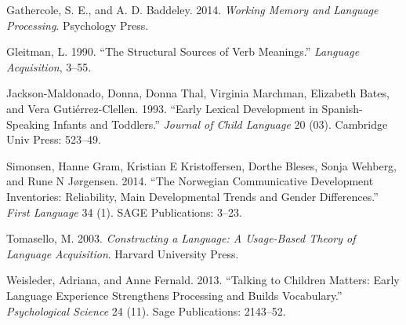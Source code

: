 \documentclass[authoryear, review]{elsarticle}
\begin{document}
Gathercole, S. E., and A. D. Baddeley. 2014. \emph{Working Memory and
Language Processing}. Psychology Press.

Gleitman, L. 1990. ``The Structural Sources of Verb Meanings.''
\emph{Language Acquisition}, 3--55.

Jackson-Maldonado, Donna, Donna Thal, Virginia Marchman, Elizabeth
Bates, and Vera Gutiérrez-Clellen. 1993. ``Early Lexical Development in
Spanish-Speaking Infants and Toddlers.'' \emph{Journal of Child
Language} 20 (03). Cambridge Univ Press: 523--49.

Simonsen, Hanne Gram, Kristian E Kristoffersen, Dorthe Bleses, Sonja
Wehberg, and Rune N Jørgensen. 2014. ``The Norwegian Communicative
Development Inventories: Reliability, Main Developmental Trends and
Gender Differences.'' \emph{First Language} 34 (1). SAGE Publications:
3--23.

Tomasello, M. 2003. \emph{Constructing a Language: A Usage-Based Theory
of Language Acquisition}. Harvard University Press.

Weisleder, Adriana, and Anne Fernald. 2013. ``Talking to Children
Matters: Early Language Experience Strengthens Processing and Builds
Vocabulary.'' \emph{Psychological Science} 24 (11). Sage Publications:
2143--52.


\end{document}
